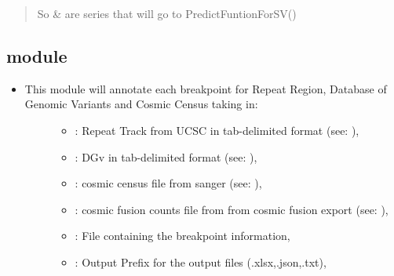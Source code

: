 \documentclass[letterpaper,10pt,english]{sphinxmanual}
\begin{document}
\begin{itemize}
\begin{description}
\begin{quote}
\begin{description}
So  \&  are series that will go to PredictFuntionForSV()


\end{description}\end{quote}

\end{description}

\end{itemize}


\subsection{ module}
\label{\detokenize{iAnnotateSV:addexternalannotations-module}}\begin{itemize}
\item {} \begin{description}
\item[{This module will annotate each breakpoint for Repeat Region, Database of Genomic Variants and Cosmic Census taking in:}] \leavevmode\begin{itemize}
\item {} 
 : Repeat Track from UCSC in tab-delimited format (see: ),

\item {} 
 : DGv in tab-delimited format (see: ),

\item {} 
 : cosmic census file from sanger (see: ),

\item {} 
 : cosmic fusion counts file from from cosmic fusion export (see: ),

\item {} 
 : File containing the breakpoint information,

\item {} 
 : Output Prefix for the output files (.xlsx,.json,.txt),


\end{itemize}
\end{description}
\end{itemize}
\end{document}
